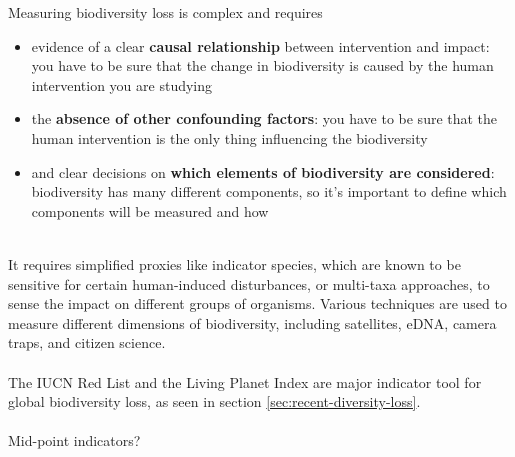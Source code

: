 \documentclass[../summary.tex]{subfiles}
\begin{document}
Measuring biodiversity loss is complex and requires

\begin{itemize}
	\item evidence of a clear \textbf{causal relationship }between intervention and impact: you have to be sure that the change in biodiversity is caused by the human intervention you are studying
	\item the \textbf{absence of other confounding factors}: you have to be sure that the human intervention is the only thing influencing the biodiversity
	\item and clear decisions on \textbf{which elements of biodiversity are considered}: biodiversity has many different components, so it’s important to define which components will be measured and how
\end{itemize}
 \ \\
 It requires simplified proxies like indicator species, which are known to be sensitive for certain human-induced disturbances,  or multi-taxa approaches, to sense the impact on different groups of organisms. Various techniques are used to measure different dimensions of biodiversity, including satellites, eDNA, camera traps, and citizen science.\\
 \\
 The IUCN Red List and the Living Planet Index are major indicator tool for global biodiversity loss, as seen in section \ref{sec:recent-diversity-loss}.
\\
\\
Mid-point indicators?
\end{document}
